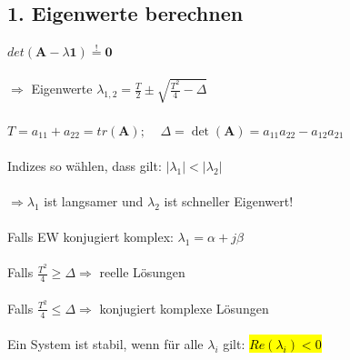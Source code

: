 \documentclass[a4paper,twocolumn,10pt]{article}
\newcommand{\sollsein}{\stackrel{!}{=}}
\begin{document}
\subsection*{1. Eigenwerte berechnen}
$det(\textbf{A}-\lambda \textbf{1})\sollsein \textbf{0}$\\\\
$\Rightarrow$ Eigenwerte $\lambda_{1,2}=\frac{T}{2}\pm \sqrt{\frac{T^2}{4}-\Delta}$\\\\
$T=a_{11}+a_{22}=tr(\textbf{A});\;\;\;\;\Delta =\det(\textbf{A})=a_{11}a_{22}-a_{12}a_{21}$\\\\
Indizes so wählen, dass gilt: $|\lambda_1|<|\lambda_2|$\\\\
$\Rightarrow \lambda_1$ ist langsamer und $\lambda_2$ ist schneller Eigenwert!\\\\
Falls EW konjugiert komplex: $\lambda_1=\alpha +j\beta$\\\\
Falls $\frac{T^2}{4}\ge \Delta \Rightarrow$ reelle Lösungen\\\\
Falls $\frac{T^2}{4}\le \Delta \Rightarrow$ konjugiert komplexe Lösungen\\\\
Ein System ist stabil, wenn für alle $\lambda_i$ gilt: \hl{$Re(\lambda_i)<0$}
\end{document}
